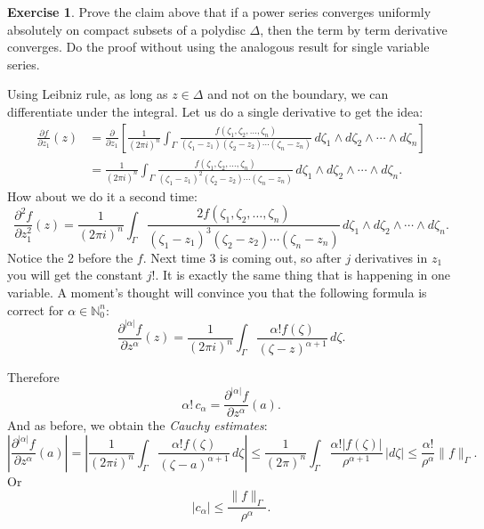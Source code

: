 \documentclass[12pt,openany]{book}
\newcommand{\sabs}[1]{\lvert {#1} \rvert}
\newcommand{\snorm}[1]{\lVert {#1} \rVert}
\newcommand{\abs}[1]{\left\lvert {#1} \right\rvert}
\newcommand{\N}{{\mathbb{N}}}
\newcommand{\myindex}[1]{#1\index{#1}}
\theoremstyle{plain}
\theoremstyle{remark}
\theoremstyle{definition}
\newenvironment{exbox}{%
    \def\FrameCommand{\vrule width 1pt \relax\hspace {10pt}}%
    \MakeFramed {\advance \hsize -\width \FrameRestore }%
}{%
    \endMakeFramed
}
\theoremstyle{exercise}
\newtheorem{exercise}{Exercise}[section]
\theoremstyle{example}
\begin{document}
\begin{exbox}
\begin{exercise}
Prove the claim above that if a power series converges uniformly absolutely
on compact subsets of a polydisc $\Delta$, then the term by term derivative
converges.
Do the proof without using the analogous result for single variable series.
\end{exercise}
\end{exbox}

Using Leibniz rule, as long as $z \in \Delta$ and not on the boundary,
we can differentiate under the integral.  Let us do a single derivative to
get the idea:
\begin{equation*}
\begin{split}
\frac{\partial f}{\partial z_1}(z) &=
\frac{\partial}{\partial z_1} \left[
\frac{1}{{(2\pi i)}^n}
\int_{\Gamma}
\frac{f(\zeta_1,\zeta_2,\ldots,\zeta_n)}{(\zeta_1-z_1)(\zeta_2-z_2)\cdots(\zeta_n-z_n)}
\,
d \zeta_1 
\wedge
d \zeta_2
\wedge
\cdots
\wedge
d \zeta_n 
\right]
\\
& =
\frac{1}{{(2\pi i)}^n}
\int_{\Gamma}
\frac{f(\zeta_1,\zeta_2,\ldots,\zeta_n)}{{(\zeta_1-z_1)}^2(\zeta_2-z_2)\cdots(\zeta_n-z_n)}
\,
d \zeta_1 
\wedge
d \zeta_2
\wedge
\cdots
\wedge
d \zeta_n .
\end{split}
\end{equation*}
How about we do it a second time:
\begin{equation*}
\frac{\partial^2 f}{\partial z_1^2}(z) 
=
\frac{1}{{(2\pi i)}^n}
\int_{\Gamma}
\frac{2 f(\zeta_1,\zeta_2,\ldots,\zeta_n)}{{(\zeta_1-z_1)}^3(\zeta_2-z_2)\cdots(\zeta_n-z_n)}
\,
d \zeta_1 
\wedge
d \zeta_2
\wedge
\cdots
\wedge
d \zeta_n .
\end{equation*}
Notice the 2 before the $f$.  Next time 3 is coming out, so after $j$
derivatives in $z_1$ you will get the constant $j!$.
It is exactly the same thing that is happening in one variable.  A moment's
thought will convince you that the following formula is correct for
$\alpha \in \N_0^n$:
\begin{equation*}
\frac{\partial^{\sabs{\alpha}}f}{\partial z^\alpha} (z) =
\frac{1}{{(2\pi i)}^n}
\int_{\Gamma}
\frac{\alpha! f(\zeta)}{{(\zeta-z)}^{\alpha+1}}
\,
d \zeta .
\end{equation*}

Therefore
\begin{equation*}
\alpha! \, c_\alpha = 
\frac{\partial^{\sabs{\alpha}} f}{\partial z^\alpha} (a) .
\end{equation*}
And as before, we obtain the \emph{\myindex{Cauchy estimates}}:
\begin{equation*}
\abs{\frac{\partial^{\sabs{\alpha}}f}{\partial z^\alpha}(a)}
=
\abs{
\frac{1}{{(2\pi i)}^n}
\int_{\Gamma}
\frac{\alpha! f(\zeta)}{{(\zeta-a)}^{\alpha+1}}
\,
d \zeta }
\leq
\frac{1}{{(2\pi)}^n}
\int_{\Gamma}
\frac{\alpha! \sabs{f(\zeta)}}{\rho^{\alpha+1}}
\,
\sabs{d \zeta}
\leq
\frac{\alpha!}{\rho^\alpha}
\snorm{f}_\Gamma .
\end{equation*}
Or
\begin{equation*}
\sabs{c_\alpha} \leq 
\frac{\snorm{f}_\Gamma}{\rho^\alpha} .
\end{equation*}
\end{document}
